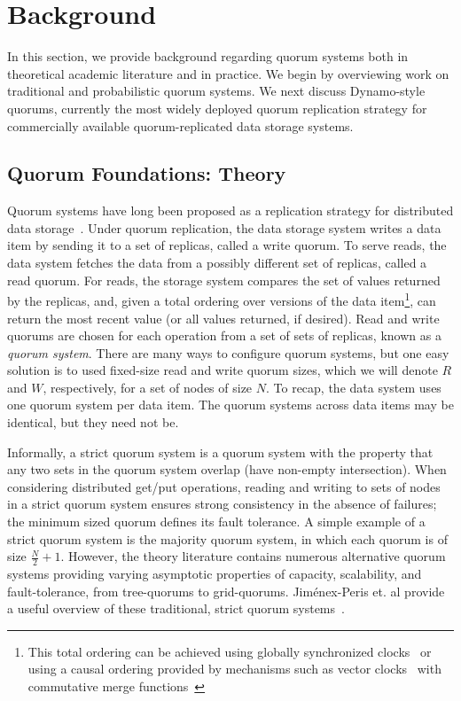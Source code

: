 \documentclass{vldb}
\begin{document}
\section{Background}
\label{sec:background}

In this section, we provide background regarding quorum systems both
in theoretical academic literature and in practice.  We begin by
overviewing work on traditional and probabilistic quorum systems.  We
next discuss Dynamo-style quorums, currently the most widely deployed
quorum replication strategy for commercially available
quorum-replicated data storage systems.

\subsection{Quorum Foundations: Theory}

Quorum systems have long been proposed as a replication strategy for
distributed data storage~\cite{quorums-start}.  Under quorum
replication, the data storage system writes a data item by sending it
to a set of replicas, called a write quorum.  To serve reads, the data
system fetches the data from a possibly different set of replicas,
called a read quorum.  For reads, the storage system compares the set
of values returned by the replicas, and, given a total ordering over
versions of the data item\footnote{This total ordering can be achieved
  using globally synchronized clocks~\cite{synch-clocks} or using a
  causal ordering provided by mechanisms such as vector
  clocks~\cite{vectorclock} with commutative merge
  functions~\cite{cops}}, can return the most recent value (or all
values returned, if desired).  Read and write quorums are chosen for
each operation from a set of sets of replicas, known as a
\textit{quorum system}.  There are many ways to configure quorum
systems, but one easy solution is to used fixed-size read and write
quorum sizes, which we will denote $R$ and $W$, respectively, for a
set of nodes of size $N$.  To recap, the data system uses one quorum
system per data item.  The quorum systems across data items may be
identical, but they need not be.

Informally, a strict quorum system is a quorum system with the
property that any two sets in the quorum system overlap (have
non-empty intersection). When considering distributed get/put
operations, reading and writing to sets of nodes in a strict quorum
system ensures strong consistency in the absence of failures; the
minimum sized quorum defines its fault tolerance.  A simple example of
a strict quorum system is the majority quorum system, in which each
quorum is of size $\frac{N}{2}+1$.  However, the theory literature
contains numerous alternative quorum systems providing varying
asymptotic properties of capacity, scalability, and fault-tolerance,
from tree-quorums to grid-quorums.  Jim\'{e}nex-Peris et. al provide a
useful overview of these traditional, strict quorum
systems~\cite{quorums-alternative}.
\end{document}
